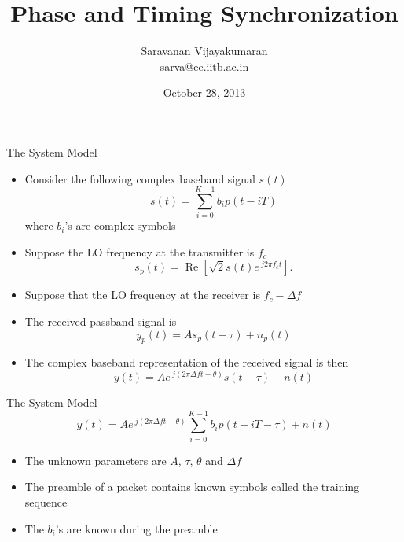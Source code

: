 \documentclass[t]{beamer}
\title[EE 703 DMT]{Phase and Timing Synchronization}
\author[Saravanan V]
{
  Saravanan Vijayakumaran\\
  \href{mailto:sarva@ee.iitb.ac.in}{sarva@ee.iitb.ac.in}
}
\institute[IIT Bombay]
{
  Department of Electrical Engineering\\
  Indian Institute of Technology Bombay
}
\date{October 28, 2013}
\renewcommand\Re{\operatorname{Re}}
\begin{document}
\begin{frame}
  \titlepage
\end{frame}

\begin{frame}{The System Model}
  \footnotesize
  \begin{itemize}
    \item \pause Consider the following complex baseband signal $s(t)$
      \begin{equation*}
        s(t) = \sum_{i=0}^{K-1} b_i p(t-iT)
      \end{equation*}
      where $b_i$'s are complex symbols
    \item \pause Suppose the LO frequency at the transmitter is $f_c$
      \begin{equation*}
        s_p(t) = \Re\left[\sqrt{2}s(t)e^{\ j2\pi f_c t}\right].
      \end{equation*}
    \item \pause Suppose that the LO frequency at the receiver is $f_c - \Delta f$
    \item \pause The received passband signal is
      \begin{equation*}
        y_p(t) = As_p(t-\tau) + n_p(t)
      \end{equation*}
    \item \pause The complex baseband representation of the received signal is then
      \begin{equation*}
        y(t) = Ae^{\ j(2\pi \Delta f t + \theta)}s(t-\tau) + n(t)
      \end{equation*}
  \end{itemize}
  \normalsize
\end{frame}

\begin{frame}{The System Model}
  \footnotesize
      \begin{equation*}
        y(t) = Ae^{\ j(2\pi \Delta f t + \theta)} \sum_{i=0}^{K-1} b_i p(t-iT-\tau) + n(t)
      \end{equation*}
  \begin{itemize}
    \item \pause The unknown parameters are $A$, $\tau$, $\theta$ and $\Delta f$
    \item \pause The preamble of a packet contains known symbols called the training sequence
    \item \pause The $b_i$'s are known during the preamble
  \end{itemize}
  \normalsize
\end{frame}
\end{document}
